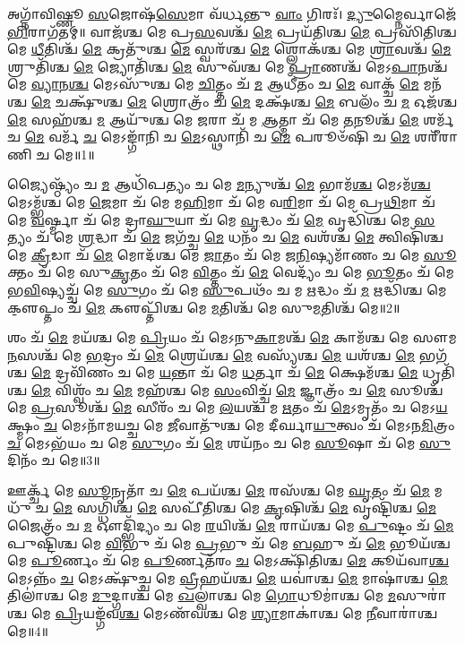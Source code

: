 

𑌅𑌗𑍍𑌨𑌾᳴𑌵𑌿𑌷𑍍𑌣𑍂 \ul{𑌸}\-𑌜𑍋𑌷᳴\-\ul{𑌸𑍇}\-𑌮𑌾 𑌵᳴𑌰𑍍𑌧𑌨𑍍𑌤𑍁 \ul{𑌵𑌾𑌂} 𑌗𑌿𑌰𑌃᳴। \ul{𑌦𑍍𑌯𑍁}\-𑌮𑍍𑌨𑍈𑌰𑍍𑌵𑌾𑌜𑍇᳴\-\ul{𑌭𑌿}\-𑌰𑌾\-𑌗᳴𑌤𑌮𑍍॥ 
𑌵𑌾𑌜᳴𑌶𑍍𑌚 𑌮𑍇 𑌪𑍍𑌰\-\ul{𑌸}\-𑌵𑌶𑍍𑌚᳴ \ul{𑌮𑍇} 𑌪𑍍𑌰𑌯᳴𑌤𑌿𑌶𑍍𑌚 \ul{𑌮𑍇} 𑌪𑍍𑌰𑌸𑌿᳴𑌤𑌿𑌶𑍍𑌚 𑌮𑍇 \ul{𑌧𑍀}\-𑌤𑌿𑌶𑍍𑌚᳴ \ul{𑌮𑍇} 𑌕𑍍𑌰𑌤𑍁᳴𑌶𑍍𑌚 \ul{𑌮𑍇} 𑌸𑍍𑌵𑌰᳴𑌶𑍍𑌚 \ul{𑌮𑍇} 𑌶𑍍𑌲𑍋𑌕᳴𑌶𑍍𑌚 𑌮𑍇 \ul{𑌶𑍍𑌰𑌾}\-𑌵𑌶𑍍𑌚᳴ \ul{𑌮𑍇} 𑌶𑍍𑌰𑍁𑌤𑌿᳴𑌶𑍍𑌚 \ul{𑌮𑍇} 𑌜𑍍𑌯𑍋𑌤𑌿᳴𑌶𑍍𑌚 \ul{𑌮𑍇} 𑌸𑍁𑌵᳴𑌶𑍍𑌚 𑌮𑍇 \ul{𑌪𑍍𑌰𑌾}\-𑌣𑌶𑍍𑌚᳴ 𑌮𑍇𑌽\-\ul{𑌪𑌾}\-𑌨𑌶𑍍𑌚᳴ 𑌮𑍇 \ul{𑌵𑍍𑌯𑌾}\-𑌨\-\ul{𑌶𑍍𑌚} 𑌮𑍇𑌽𑌸𑍁᳴𑌶𑍍𑌚 𑌮𑍇 \ul{𑌚𑌿}\-𑌤𑍍𑌤𑌂 𑌚᳴ \ul{𑌮} 𑌆𑌧𑍀᳴𑌤𑌂 𑌚 \ul{𑌮𑍇} 𑌵𑌾𑌕𑍍𑌚᳴ \ul{𑌮𑍇} 𑌮𑌨᳴𑌶𑍍𑌚 \ul{𑌮𑍇} 𑌚𑌕𑍍𑌷𑍁᳴𑌶𑍍𑌚 \ul{𑌮𑍇} 𑌶𑍍𑌰𑍋𑌤𑍍𑌰𑌂᳴ 𑌚 \ul{𑌮𑍇} 𑌦𑌕𑍍𑌷᳴𑌶𑍍𑌚 \ul{𑌮𑍇} 𑌬𑌲𑌂᳴ 𑌚 \ul{𑌮} 𑌓𑌜᳴𑌶𑍍𑌚 \ul{𑌮𑍇} 𑌸𑌹᳴𑌶𑍍𑌚 \ul{𑌮} 𑌆𑌯𑍁᳴𑌶𑍍𑌚 𑌮𑍇 \ul{𑌜}\-𑌰𑌾 𑌚᳴ 𑌮 \ul{𑌆}\-𑌤𑍍𑌮𑌾 𑌚᳴ 𑌮𑍇 \ul{𑌤}\-𑌨𑍂𑌶𑍍𑌚᳴ \ul{𑌮𑍇} 𑌶𑌰𑍍𑌮᳴ 𑌚 \ul{𑌮𑍇} 𑌵𑌰𑍍𑌮᳴ \ul{𑌚} 𑌮𑍇𑌽𑌙𑍍𑌗𑌾᳴𑌨𑌿 𑌚 \ul{𑌮𑍇}\-𑌽𑌸𑍍𑌥𑌾𑌨𑌿᳴ 𑌚 \ul{𑌮𑍇} 𑌪𑌰𑍂𑍞᳴𑌷𑌿 𑌚 \ul{𑌮𑍇} 𑌶𑌰𑍀᳴𑌰𑌾𑌣𑌿 𑌚 𑌮𑍇॥1॥ 

𑌜𑍍𑌯𑍈𑌷𑍍𑌠𑍍𑌯𑌂᳴ 𑌚 \ul{𑌮} 𑌆𑌧𑌿᳴𑌪𑌤𑍍𑌯𑌂 𑌚 𑌮𑍇 \ul{𑌮}\-𑌨𑍍𑌯𑍁𑌶𑍍𑌚᳴ \ul{𑌮𑍇} 𑌭𑌾𑌮᳴\-\ul{𑌶𑍍𑌚} 𑌮𑍇𑌽𑌮᳴\-\ul{𑌶𑍍𑌚} 𑌮𑍇𑌽𑌮𑍍𑌭᳴𑌶𑍍𑌚 𑌮𑍇 \ul{𑌜𑍇}\-𑌮𑌾 𑌚᳴ 𑌮𑍇 𑌮\-\ul{𑌹𑌿}\-𑌮𑌾 𑌚᳴ 𑌮𑍇 𑌵\-\ul{𑌰𑌿}\-𑌮𑌾 𑌚᳴ 𑌮𑍇 𑌪𑍍𑌰\-\ul{𑌥𑌿}\-𑌮𑌾 𑌚᳴ 𑌮𑍇 \ul{𑌵}\-𑌰𑍍𑌷𑍍𑌮𑌾 𑌚᳴ 𑌮𑍇 𑌦𑍍𑌰𑌾\-\ul{𑌘𑍁}\-𑌯𑌾 𑌚᳴ 𑌮𑍇 \ul{𑌵𑍃}\-𑌦𑍍𑌧𑌂 𑌚᳴ \ul{𑌮𑍇} 𑌵𑍃𑌦𑍍𑌧𑌿᳴𑌶𑍍𑌚 𑌮𑍇 \ul{𑌸}\-𑌤𑍍𑌯𑌂 𑌚᳴ 𑌮𑍇 \ul{𑌶𑍍𑌰}\-𑌦𑍍𑌧𑌾 𑌚᳴ \ul{𑌮𑍇} 𑌜𑌗᳴𑌚𑍍𑌚 \ul{𑌮𑍇} 𑌧𑌨𑌂᳴ 𑌚 \ul{𑌮𑍇} 𑌵𑌶᳴𑌶𑍍𑌚 \ul{𑌮𑍇} 𑌤𑍍𑌵𑌿𑌷𑌿᳴𑌶𑍍𑌚 𑌮𑍇 \ul{𑌕𑍍𑌰𑍀}\-𑌡𑌾 𑌚᳴ \ul{𑌮𑍇} 𑌮𑍋𑌦᳴𑌶𑍍𑌚 𑌮𑍇 \ul{𑌜𑌾}\-𑌤𑌂 𑌚᳴ 𑌮𑍇 𑌜\-\ul{𑌨𑌿}\-𑌷𑍍𑌯𑌮𑌾᳴𑌣𑌂 𑌚 𑌮𑍇 \ul{𑌸𑍂}\-𑌕𑍍𑌤𑌂 𑌚᳴ 𑌮𑍇 𑌸𑍁\-\ul{𑌕𑍃}\-𑌤𑌂 𑌚᳴ 𑌮𑍇 \ul{𑌵𑌿}\-𑌤𑍍𑌤𑌂 𑌚᳴ \ul{𑌮𑍇} 𑌵𑍇𑌦𑍍𑌯𑌂᳴ 𑌚 𑌮𑍇 \ul{𑌭𑍂}\-𑌤𑌂 𑌚᳴ 𑌮𑍇 𑌭\-\ul{𑌵𑌿}\-𑌷𑍍𑌯𑌚𑍍𑌚᳴ 𑌮𑍇 \ul{𑌸𑍁}\-𑌗𑌂 𑌚᳴ 𑌮𑍇 \ul{𑌸𑍁}\-𑌪𑌥𑌂᳴ 𑌚 𑌮 \ul{𑌋}\-𑌦𑍍𑌧𑌂 𑌚᳴ \ul{𑌮} 𑌋𑌦𑍍𑌧𑌿᳴𑌶𑍍𑌚 𑌮𑍇 𑌕𑍢॒𑌪𑍍𑌤𑌂 𑌚᳴ \ul{𑌮𑍇} 𑌕𑍢𑌪𑍍𑌤𑌿᳴𑌶𑍍𑌚 𑌮𑍇 \ul{𑌮}\-𑌤𑌿𑌶𑍍𑌚᳴ 𑌮𑍇 𑌸𑍁\-\ul{𑌮}\-𑌤𑌿𑌶𑍍𑌚᳴ 𑌮𑍇॥2॥ 

𑌶𑌂 𑌚᳴ \ul{𑌮𑍇} 𑌮𑌯᳴𑌶𑍍𑌚 𑌮𑍇 \ul{𑌪𑍍𑌰𑌿}\-𑌯𑌂 𑌚᳴ 𑌮𑍇𑌽𑌨𑍁\-\ul{𑌕𑌾}\-𑌮𑌶𑍍𑌚᳴ \ul{𑌮𑍇} 𑌕𑌾𑌮᳴𑌶𑍍𑌚 𑌮𑍇 𑌸𑍗𑌮\-\ul{𑌨}\-𑌸𑌶𑍍𑌚᳴ 𑌮𑍇 \ul{𑌭}\-𑌦𑍍𑌰𑌂 𑌚᳴ \ul{𑌮𑍇} 𑌶𑍍𑌰𑍇𑌯᳴𑌶𑍍𑌚 \ul{𑌮𑍇} 𑌵𑌸𑍍𑌯᳴𑌶𑍍𑌚 \ul{𑌮𑍇} 𑌯𑌶᳴𑌶𑍍𑌚 \ul{𑌮𑍇} 𑌭𑌗᳴𑌶𑍍𑌚 \ul{𑌮𑍇} 𑌦𑍍𑌰𑌵𑌿᳴𑌣𑌂 𑌚 𑌮𑍇 \ul{𑌯}\-𑌨𑍍𑌤𑌾 𑌚᳴ 𑌮𑍇 \ul{𑌧}\-𑌰𑍍𑌤𑌾 𑌚᳴ \ul{𑌮𑍇} 𑌕𑍍𑌷𑍇𑌮᳴𑌶𑍍𑌚 \ul{𑌮𑍇} 𑌧𑍃𑌤𑌿᳴𑌶𑍍𑌚 \ul{𑌮𑍇} 𑌵𑌿𑌶𑍍𑌵𑌂᳴ 𑌚 \ul{𑌮𑍇} 𑌮𑌹᳴𑌶𑍍𑌚 𑌮𑍇 \ul{𑌸𑌂}\-𑌵𑌿𑌚𑍍𑌚᳴ \ul{𑌮𑍇} 𑌜𑍍𑌞𑌾𑌤𑍍𑌰𑌂᳴ 𑌚 \ul{𑌮𑍇} 𑌸𑍂𑌶𑍍𑌚᳴ 𑌮𑍇 \ul{𑌪𑍍𑌰}\-𑌸𑍂𑌶𑍍𑌚᳴ \ul{𑌮𑍇} 𑌸𑍀𑌰𑌂᳴ 𑌚 𑌮𑍇 \ul{𑌲}\-𑌯𑌶𑍍𑌚᳴ 𑌮 \ul{𑌋}\-𑌤𑌂 𑌚᳴ \ul{𑌮𑍇}\-𑌽𑌮𑍃𑌤𑌂᳴ 𑌚 𑌮𑍇𑌽\-\ul{𑌯}\-𑌕𑍍𑌷𑍍𑌮𑌂 \ul{𑌚} 𑌮𑍇𑌽𑌨𑌾᳴𑌮𑌯𑌚𑍍𑌚 𑌮𑍇 \ul{𑌜𑍀}\-𑌵𑌾𑌤𑍁᳴𑌶𑍍𑌚 𑌮𑍇 𑌦𑍀𑌰𑍍𑌘𑌾\-\ul{𑌯𑍁}\-𑌤𑍍𑌵𑌂 𑌚᳴ 𑌮𑍇𑌽𑌨\-\ul{𑌮𑌿}\-𑌤𑍍𑌰𑌂 \ul{𑌚} 𑌮𑍇𑌽𑌭᳴𑌯𑌂 𑌚 𑌮𑍇 \ul{𑌸𑍁}\-𑌗𑌂 𑌚᳴ \ul{𑌮𑍇} 𑌶𑌯᳴𑌨𑌂 𑌚 𑌮𑍇 \ul{𑌸𑍂}\-𑌷𑌾 𑌚᳴ 𑌮𑍇 \ul{𑌸𑍁}\-𑌦𑌿𑌨𑌂᳴ 𑌚 𑌮𑍇॥3॥ 

𑌊𑌰𑍍𑌕𑍍𑌚᳴ 𑌮𑍇 \ul{𑌸𑍂}\-𑌨𑍃𑌤𑌾᳴ 𑌚 \ul{𑌮𑍇} 𑌪𑌯᳴𑌶𑍍𑌚 \ul{𑌮𑍇} 𑌰𑌸᳴𑌶𑍍𑌚 𑌮𑍇 \ul{𑌘𑍃}\-𑌤𑌂 𑌚᳴ \ul{𑌮𑍇} 𑌮𑌧𑍁᳴ 𑌚 \ul{𑌮𑍇} 𑌸𑌗𑍍𑌧𑌿᳴𑌶𑍍𑌚 \ul{𑌮𑍇} 𑌸𑌪𑍀᳴𑌤𑌿𑌶𑍍𑌚 𑌮𑍇 \ul{𑌕𑍃}\-𑌷𑌿𑌶𑍍𑌚᳴ \ul{𑌮𑍇} 𑌵𑍃𑌷𑍍𑌟𑌿᳴𑌶𑍍𑌚 \ul{𑌮𑍇} 𑌜𑍈𑌤𑍍𑌰𑌂᳴ 𑌚 \ul{𑌮} 𑌔𑌦𑍍𑌭𑌿᳴𑌦𑍍𑌯𑌂 𑌚 𑌮𑍇 \ul{𑌰}\-𑌯𑌿𑌶𑍍𑌚᳴ \ul{𑌮𑍇} 𑌰𑌾𑌯᳴𑌶𑍍𑌚 𑌮𑍇 \ul{𑌪𑍁}\-𑌷𑍍𑌟𑌂 𑌚᳴ \ul{𑌮𑍇} 𑌪𑍁𑌷𑍍𑌟𑌿᳴𑌶𑍍𑌚 𑌮𑍇 \ul{𑌵𑌿}\-𑌭𑍁 𑌚᳴ 𑌮𑍇 \ul{𑌪𑍍𑌰}\-𑌭𑍁 𑌚᳴ 𑌮𑍇 \ul{𑌬}\-𑌹𑍁 𑌚᳴ \ul{𑌮𑍇} 𑌭𑍂𑌯᳴𑌶𑍍𑌚 𑌮𑍇 \ul{𑌪𑍂}\-𑌰𑍍𑌣𑌂 𑌚᳴ 𑌮𑍇 \ul{𑌪𑍂}\-𑌰𑍍𑌣𑌤᳴𑌰𑌂 \ul{𑌚} 𑌮𑍇𑌽𑌕𑍍𑌷𑌿᳴𑌤𑌿𑌶𑍍𑌚 \ul{𑌮𑍇} 𑌕𑍂𑌯᳴𑌵𑌾\-\ul{𑌶𑍍𑌚} 𑌮𑍇𑌽𑌨𑍍𑌨𑌂᳴ \ul{𑌚} 𑌮𑍇𑌽𑌕𑍍𑌷𑍁᳴𑌚𑍍𑌚 𑌮𑍇 \ul{𑌵𑍍𑌰𑍀}\-𑌹𑌯᳴𑌶𑍍𑌚 \ul{𑌮𑍇} 𑌯𑌵𑌾॑𑌶𑍍𑌚 \ul{𑌮𑍇} 𑌮𑌾𑌷𑌾॑𑌶𑍍𑌚 \ul{𑌮𑍇} 𑌤𑌿𑌲𑌾॑𑌶𑍍𑌚 𑌮𑍇 \ul{𑌮𑍁}\-𑌦𑍍𑌗𑌾𑌶𑍍𑌚᳴ 𑌮𑍇 \ul{𑌖}\-𑌲𑍍𑌵𑌾॑𑌶𑍍𑌚 𑌮𑍇 \ul{𑌗𑍋}\-𑌧𑍂𑌮𑌾॑𑌶𑍍𑌚 𑌮𑍇 \ul{𑌮}\-𑌸𑍁𑌰𑌾॑𑌶𑍍𑌚 𑌮𑍇 \ul{𑌪𑍍𑌰𑌿}\-𑌯𑌙𑍍𑌗᳴𑌵\-\ul{𑌶𑍍𑌚} 𑌮𑍇𑌽𑌣᳴𑌵𑌶𑍍𑌚 𑌮𑍇 \ul{𑌶𑍍𑌯𑌾}\-𑌮𑌾𑌕𑌾॑𑌶𑍍𑌚 𑌮𑍇 \ul{𑌨𑍀}\-𑌵𑌾𑌰𑌾॑𑌶𑍍𑌚 𑌮𑍇॥4॥ 

